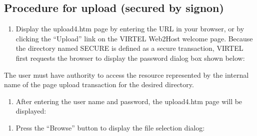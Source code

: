 \documentclass[letterpaper,10pt,english]{sphinxmanual}
\begin{document}
\subsection{Procedure for upload (secured by signon)}
\label{\detokenize{audit_operations_ and_performance:procedure-for-upload-secured-by-signon}}\label{\detokenize{audit_operations_ and_performance:index-59}}\begin{enumerate}
\def\theenumi{\arabic{enumi}}
\def\labelenumi{\theenumi .}
\makeatletter\def\p@enumii{\p@enumi \theenumi .}\makeatother
\item {} 
Display the upload4.htm page by entering the URL  in your browser, or by clicking the “Upload” link on the VIRTEL Web2Host welcome page. Because the directory named SECURE is defined as a secure transaction, VIRTEL first requests the browser to display the password dialog box shown below:

\end{enumerate}



The user must have authority to access the resource represented by the internal name of the page upload transaction for the desired directory.
\begin{enumerate}
\def\theenumi{\arabic{enumi}}
\def\labelenumi{\theenumi .}
\makeatletter\def\p@enumii{\p@enumi \theenumi .}\makeatother
\setcounter{enumi}{1}
\item {} 
After entering the user name and password, the upload4.htm page will be displayed:

\end{enumerate}


\begin{enumerate}
\def\theenumi{\arabic{enumi}}
\def\labelenumi{\theenumi .}
\makeatletter\def\p@enumii{\p@enumi \theenumi .}\makeatother
\setcounter{enumi}{2}
\item {} 
Press the “Browse” button to display the file selection dialog:

\end{enumerate}

\end{document}

